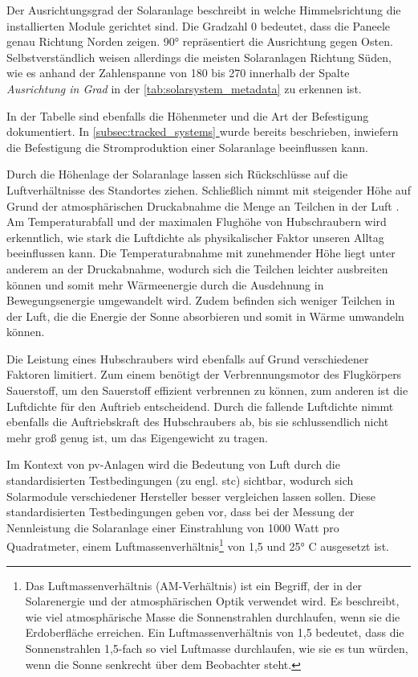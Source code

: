\documentclass[12pt, a4paper]{article}
\newcommand*{\fullref}[1]{\hyperref[{#1}]{\autoref*{#1} \textit{\nameref*{#1}}}}
\begin{document}
Der Ausrichtungsgrad der Solaranlage beschreibt in welche Himmelsrichtung die installierten Module gerichtet sind. Die Gradzahl 0 bedeutet, dass die Paneele genau Richtung Norden zeigen. 90° repräsentiert die Ausrichtung gegen Osten. Selbstverständlich weisen allerdings die meisten Solaranlagen Richtung Süden, wie es anhand der Zahlenspanne von 180 bis 270 innerhalb der Spalte \textit{Ausrichtung in Grad} in der \autoref{tab:solarsystem_metadata} zu erkennen ist.

In der Tabelle sind ebenfalls die Höhenmeter und die Art der Befestigung dokumentiert. In \fullref{subsec:tracked_systems} wurde bereits beschrieben, inwiefern die Befestigung die Stromproduktion einer Solaranlage beeinflussen kann. 

Durch die Höhenlage der Solaranlage lassen sich Rückschlüsse auf die Luftverhältnisse des Standortes ziehen. Schließlich nimmt mit steigender Höhe auf Grund der atmosphärischen Druckabnahme die Menge an Teilchen in der Luft \cite{ws:meteoschweiz}. Am Temperaturabfall und der maximalen Flughöhe von Hubschraubern wird erkenntlich, wie stark die Luftdichte als physikalischer Faktor unseren Alltag beeinflussen kann. Die Temperaturabnahme mit zunehmender Höhe liegt unter anderem an der Druckabnahme, wodurch sich die Teilchen leichter ausbreiten können und somit mehr Wärmeenergie durch die Ausdehnung in Bewegungsenergie umgewandelt wird. Zudem befinden sich weniger Teilchen in der Luft, die die Energie der Sonne absorbieren und somit in Wärme umwandeln können.


Die Leistung eines Hubschraubers wird ebenfalls auf Grund verschiedener Faktoren limitiert. Zum einem benötigt der Verbrennungsmotor des Flugkörpers Sauerstoff, um den Sauerstoff effizient verbrennen zu können, zum anderen ist die Luftdichte für den Auftrieb entscheidend. Durch die fallende Luftdichte nimmt ebenfalls die Auftriebskraft des Hubschraubers ab, bis sie schlussendlich nicht mehr groß genug ist, um das Eigengewicht zu tragen.

Im Kontext von \ac{pv}-Anlagen wird die Bedeutung von Luft durch die standardisierten Testbedingungen (zu engl. \ac{stc}) sichtbar, wodurch sich Solarmodule verschiedener Hersteller besser vergleichen lassen sollen. Diese standardisierten Testbedingungen geben vor, dass bei der Messung der Nennleistung die Solaranlage einer Einstrahlung von 1000 Watt pro Quadratmeter, einem Luftmassenverhältnis\footnote{Das Luftmassenverhältnis (AM-Verhältnis) ist ein Begriff, der in der Solarenergie und der atmosphärischen Optik verwendet wird. Es beschreibt, wie viel atmosphärische Masse die Sonnenstrahlen durchlaufen, wenn sie die Erdoberfläche erreichen. Ein Luftmassenverhältnis von 1,5 bedeutet, dass die Sonnenstrahlen 1,5-fach so viel Luftmasse durchlaufen, wie sie es tun würden, wenn die Sonne senkrecht über dem Beobachter steht.} von 1,5 und 25° C ausgesetzt ist.
\end{document}
